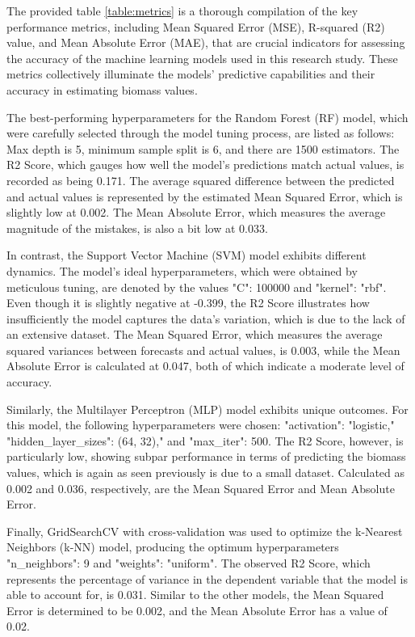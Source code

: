 \documentclass[a4paper,12pt]{report}%
\renewcommand{\\}{\vspace*{0.5\baselineskip} \newline}
\begin{document}
The provided table \ref{table:metrics} is a thorough compilation of the key performance metrics, including Mean Squared Error (MSE), R-squared (R2) value, and Mean Absolute Error (MAE), that are crucial indicators for assessing the accuracy of the machine learning models used in this research study. These metrics collectively illuminate the models' predictive capabilities and their accuracy in estimating biomass values.

\noindent The best-performing hyperparameters for the Random Forest (RF) model, which were carefully selected through the model tuning process, are listed as follows: Max depth is 5, minimum sample split is 6, and there are 1500 estimators. The R2 Score, which gauges how well the model's predictions match actual values, is recorded as being 0.171. The average squared difference between the predicted and actual values is represented by the estimated Mean Squared Error, which is slightly low at 0.002. The Mean Absolute Error, which measures the average magnitude of the mistakes, is also a bit low at 0.033.

\noindent In contrast, the Support Vector Machine (SVM) model exhibits different dynamics. The model's ideal hyperparameters, which were obtained by meticulous tuning, are denoted by the values "C": 100000 and "kernel": "rbf". Even though it is slightly negative at -0.399, the R2 Score illustrates how insufficiently the model captures the data's variation, which is due to the lack of an extensive dataset. The Mean Squared Error, which measures the average squared variances between forecasts and actual values, is 0.003, while the Mean Absolute Error is calculated at 0.047, both of which indicate a moderate level of accuracy.

\noindent Similarly, the Multilayer Perceptron (MLP) model exhibits unique outcomes. For this model, the following hyperparameters were chosen: "activation": "logistic," "hidden\_layer\_sizes": (64, 32)," and "max\_iter": 500. The R2 Score, however, is particularly low, showing subpar performance in terms of predicting the biomass values, which is again as seen previously is due to a small dataset. Calculated as 0.002 and 0.036, respectively, are the Mean Squared Error and Mean Absolute Error.

\noindent Finally, GridSearchCV with cross-validation was used to optimize the k-Nearest Neighbors (k-NN) model, producing the optimum hyperparameters "n\_neighbors": 9 and "weights": "uniform". The observed R2 Score, which represents the percentage of variance in the dependent variable that the model is able to account for, is 0.031. Similar to the other models, the Mean Squared Error is determined to be 0.002, and the Mean Absolute Error has a value of 0.02.
\end{document}
